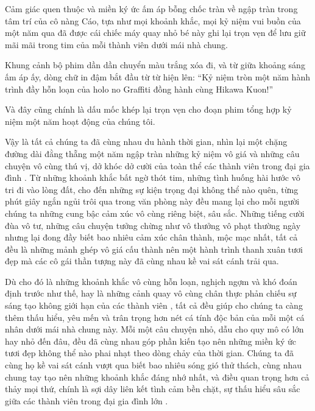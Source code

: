 \documentclass[../main.tex]{subfiles}
\begin{document}
Cảm giác quen thuộc và miền ký ức ấm áp bỗng chốc tràn về ngập tràn trong tâm trí của cô nàng Cáo, tựa như mọi khoảnh khắc, mọi kỷ niệm vui buồn của một năm qua đã được cái chiếc máy quay nhỏ bé này ghi lại trọn vẹn để lưu giữ mãi mãi trong tim của mỗi thành viên dưới mái nhà chung.


Khung cảnh bộ phim dần dần chuyển màu trắng xóa đi, và từ giữa khoảng sáng ấm áp ấy, dòng chữ in đậm bắt đầu từ từ hiện lên: ``Kỷ niệm tròn một năm hành trình đầy hỗn loạn của holo no Graffiti đồng hành cùng Hikawa Kuon!''

Và đây cũng chính là dấu mốc khép lại trọn vẹn cho đoạn phim tổng hợp kỷ niệm một năm hoạt động của chúng tôi.

\il

Vậy là tất cả chúng ta đã cùng nhau du hành thời gian, nhìn lại một chặng đường dài đằng thẵng một năm ngập tràn những kỷ niệm vô giá và những câu chuyện vô cùng thú vị, dở khóc dở cười của toàn thể các thành viên trong đại gia đình \hll. Từ những khoảnh khắc bất ngờ thót tim, những tình huống hài hước vô tri đi vào lòng đất, cho đến những sự kiện trọng đại không thể nào quên, từng phút giây ngắn ngủi trôi qua trong văn phòng này đều mang lại cho mỗi người chúng ta những cung bậc cảm xúc vô cùng riêng biệt, sâu sắc. Những tiếng cười đùa vô tư, những câu chuyện tưởng chừng như vô thưởng vô phạt thường ngày nhưng lại đong đầy biết bao nhiêu cảm xúc chân thành, mộc mạc nhất, tất cả đều là những mảnh ghép vô giá cấu thành nên một hành trình thanh xuân tươi đẹp mà các cô gái thần tượng này đã cùng nhau kề vai sát cánh trải qua.

Dù cho đó là những khoảnh khắc vô cùng hỗn loạn, nghịch ngợm và khó đoán định trước như thế, hay là những cảnh quay vô cùng chân thực phản chiếu sự sáng tạo không giới hạn của các thành viên \hll, tất cả đều giúp cho chúng ta càng thêm thấu hiểu, yêu mến và trân trọng hơn nét cá tính độc bản của mỗi một cá nhân dưới mái nhà chung này. Mỗi một câu chuyện nhỏ, dẫu cho quy mô có lớn hay nhỏ đến đâu, đều đã cùng nhau góp phần kiến tạo nên những miền ký ức tươi đẹp không thể nào phai nhạt theo dòng chảy của thời gian. Chúng ta đã cùng họ kề vai sát cánh vượt qua biết bao nhiêu sóng gió thử thách, cùng nhau chung tay tạo nên những khoảnh khắc đáng nhớ nhất, và điều quan trọng hơn cả thảy mọi thứ, chính là sợi dây liên kết tình cảm bền chặt, sự thấu hiểu sâu sắc giữa các thành viên trong đại gia đình lớn \hll.
\end{document}
